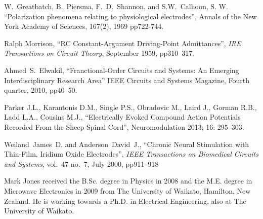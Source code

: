 \documentclass[journal, a4paper]{IEEEtran}
\begin{document}
\begin{thebibliography}{99}
    W.~Greatbatch, B.~Piersma, F.~D.~Shannon, and S.W.~Calhoon, S. W.
    ``Polarization phenomena relating to physiological electrodes'',
    Annals of the New York Academy of Sciences,
    167(2), 1969 pp722-744.

    Ralph Morrison,
    ``RC Constant-Argument Driving-Point Admittances'',
    {\em IRE Transactions on Circuit Theory},
    September 1959, pp310--317.

    Ahmed~S.~Elwakil,
    ``Franctional-Order Circuits and Systems: An Emerging Interdisciplinary Research Area''
    IEEE Circuits and Systems Magazine, Fourth quarter, 2010, pp40--50.

    Parker J.L., Karantonis D.M., Single P.S., Obradovic M., Laird J., Gorman R.B., Ladd L.A., Cousins M.J.,
    ``Electrically Evoked Compound Action Potentials Recorded From the Sheep Spinal Cord'',
    Neuromodulation 2013; 16: 295--303.

    Weiland~James~D. and Anderson~David~J.,
    ``Chronic Neural Stimulation with Thin-Film, Iridium Oxide Electrodes'',
    {\em IEEE Transactions on Biomedical Circuits and Systems},
    vol.~47 no.~7, July 2000, pp911--918




\end{thebibliography}

\begin{IEEEbiography}{Mark Jones}
received the B.Sc. degree in Physics in 2008 and the M.E. degree in Microwave Electronics in 2009 from The University of Waikato, Hamilton, New Zealand.
He is working towards a Ph.D. in Electrical Engineering, also at The University of Waikato.
\end{IEEEbiography}
\end{document}
